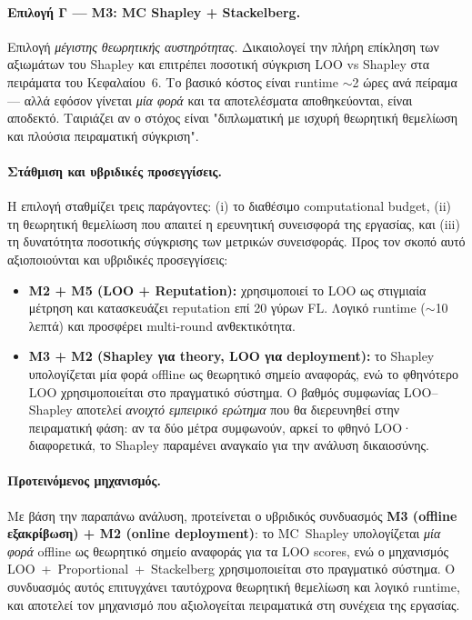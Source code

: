 \paragraph{Επιλογή Γ — M3: MC Shapley + Stackelberg.}
Επιλογή \emph{μέγιστης θεωρητικής αυστηρότητας}. Δικαιολογεί την πλήρη επίκληση των αξιωμάτων του
Shapley και επιτρέπει ποσοτική σύγκριση LOO vs Shapley στα πειράματα του Κεφαλαίου~6.
Το βασικό κόστος είναι runtime $\sim$2 ώρες ανά πείραμα — αλλά εφόσον γίνεται \emph{μία φορά} και τα
αποτελέσματα αποθηκεύονται, είναι αποδεκτό. Ταιριάζει αν ο στόχος είναι "διπλωματική με ισχυρή
θεωρητική θεμελίωση και πλούσια πειραματική σύγκριση".

\paragraph{Στάθμιση και υβριδικές προσεγγίσεις.} Η επιλογή σταθμίζει τρεις παράγοντες: (i) το
διαθέσιμο computational budget, (ii) τη θεωρητική θεμελίωση που απαιτεί η ερευνητική συνεισφορά της
εργασίας, και (iii) τη δυνατότητα ποσοτικής σύγκρισης των μετρικών συνεισφοράς. Προς τον σκοπό αυτό
αξιοποιούνται και υβριδικές προσεγγίσεις:

\begin{itemize}
    \item \textbf{M2 + M5 (LOO + Reputation):} χρησιμοποιεί το LOO ως στιγμιαία μέτρηση και κατασκευάζει
    reputation επί 20 γύρων FL. Λογικό runtime ($\sim$10 λεπτά) και προσφέρει multi-round
    ανθεκτικότητα.

    \item \textbf{M3 + M2 (Shapley για theory, LOO για deployment):} το Shapley υπολογίζεται μία φορά
    offline ως θεωρητικό σημείο αναφοράς, ενώ το φθηνότερο LOO χρησιμοποιείται στο πραγματικό
    σύστημα. Ο βαθμός συμφωνίας LOO--Shapley αποτελεί \emph{ανοιχτό εμπειρικό ερώτημα} που θα
    διερευνηθεί στην πειραματική φάση: αν τα δύο μέτρα συμφωνούν, αρκεί το φθηνό LOO·
    διαφορετικά, το Shapley παραμένει αναγκαίο για την ανάλυση δικαιοσύνης.
\end{itemize}

\paragraph{Προτεινόμενος μηχανισμός.} Με βάση την παραπάνω ανάλυση, προτείνεται ο υβριδικός συνδυασμός
\textbf{M3 (offline εξακρίβωση) + M2 (online deployment)}: το MC~Shapley υπολογίζεται \emph{μία φορά}
offline ως θεωρητικό σημείο αναφοράς για τα LOO scores, ενώ ο μηχανισμός LOO~+~Proportional~+~Stackelberg
χρησιμοποιείται στο πραγματικό σύστημα. Ο συνδυασμός αυτός επιτυγχάνει ταυτόχρονα θεωρητική
θεμελίωση και λογικό runtime, και αποτελεί τον μηχανισμό που αξιολογείται πειραματικά στη συνέχεια
της εργασίας.

